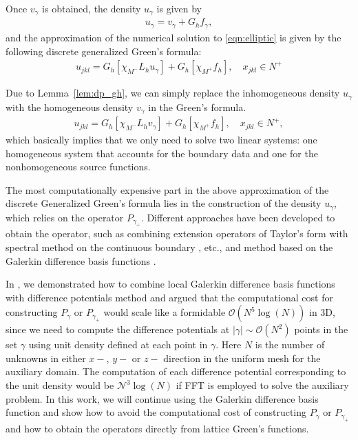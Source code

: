 Once $v_\gamma$ is obtained, the density $u_\gamma$ is given by
\begin{align}
u_\gamma = v_\gamma + G_hf_\gamma,
\end{align}
and the approximation of the numerical solution to \eqref{eqn:elliptic} is given by the following discrete generalized Green's formula:
\begin{align}\label{eqn:discrete_green_u}
u_{jkl} = G_h[\chi_{M^-}L_hu_\gamma] + G_h[\chi_{M^+}f_h], \quad x_{jkl}\in N^+
\end{align}

\begin{remark}
Due to Lemma~\ref{lem:dp_gh}, we can simply replace the inhomogeneous density $u_\gamma$ with the homogeneous density $v_{\gamma}$ in the Green's formula.
\begin{align}\label{eqn:discrete_green_v}
u_{jkl} = G_h[\chi_{M^-}L_hv_\gamma] + G_h[\chi_{M^+}f_h], \quad x_{jkl}\in N^+,
\end{align}
which basically implies that we only need to solve two linear systems: one homogeneous system that accounts for the boundary data and one for the nonhomogeneous source functions.
\end{remark}

The most computationally expensive part in the above approximation of the discrete Generalized Green's formula lies in the construction of the density $u_\gamma$, which relies on the operator $P_{\gamma_+}$. Different approaches have been developed to obtain the operator, such as combining extension operators of Taylor's form with spectral method on the continuous boundary \cite{ryaben2012method,medvinsky2012method,epshteyn2012upwind}, etc., and method based on the Galerkin difference basis functions \cite{xia2023local}.

In \cite{xia2023local}, we demonstrated how to combine local Galerkin difference basis functions with difference potentials method and argued that the computational cost for constructing $P_{\gamma}$ or $P_{\gamma_+}$ would scale like a formidable $\mathcal{O}(N^5\log(N))$ in 3D, since we need to compute the difference potentials at $|\gamma|\sim\mathcal{O}(N^2)$ points in the set $\gamma$ using unit density defined at each point in $\gamma$. Here $N$ is the number of unknowns in either $x-$, $y-$ or $z-$ direction in the uniform mesh for the auxiliary domain. The computation of each difference potential corresponding to the unit density would be $\mathcal{N^3}\log(N)$ if FFT is employed to solve the auxiliary problem. In this work, we will continue using the Galerkin difference basis function and show how to avoid the computational cost of constructing $P_{\gamma}$ or $P_{\gamma_+}$ and how to obtain the operators directly from lattice Green's functions.


